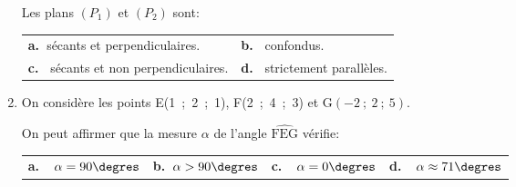 \begin{enumerate}[resume]
Les plans $\left(P_1\right)$ et $\left(P_2\right)$ sont:
\begin{center}
\begin{tabularx}{\linewidth}{X X}
\textbf{a.~}sécants et perpendiculaires.&\textbf{b.~} confondus.\\
\textbf{c.~} sécants et non perpendiculaires.& \textbf{d.~} strictement parallèles.
\end{tabularx}
\end{center}

\item On considère les points E(1~;~2~;~1), F(2~;~4~;~3) et G$(-2~;~ 2~;~5)$.

On peut affirmer que la mesure $\alpha$ de l'angle $\widehat{\text{FEG}}$ vérifie:
\begin{center}
\begin{tabularx}{\linewidth}{X X X X}
\textbf{a.~~}$\alpha = 90\degres$&\textbf{b.~\phantom{-}}$\alpha > 90\degres$
 &\textbf{c.~~}$\alpha = 0\degres$&\textbf{d.~~}$\alpha \approx  71\degres$
\end{tabularx}
\end{center}
\end{enumerate}

\bigskip
